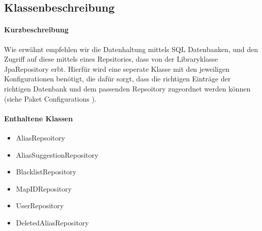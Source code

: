 \subsection*{Klassenbeschreibung}%
\paragraph*{Kurzbeschreibung}
Wie erwähnt empfehlen wir die Datenhaltung mittels SQL Datenbanken, und den Zugriff auf diese mittels eines Repsitories,
dass von der Libraryklasse \dq JpaRepository \dq erbt. Hierfür wird eine seperate Klasse mit den jeweiligen Konfigurationen benötigt,
die dafür sorgt, dass die richtigen Einträge der richtigen Datenbank und dem passenden Repsoitory zugeordnet werden können (siehe Paket \dq Configurations \dq).

\paragraph*{Enthaltene Klassen}
\begin{itemize}
    \item AliasRepsoitory
    \item AliasSuggestionRepository
    \item BlacklistRepository
    \item MapIDRepository
    \item UserRepository
    \item DeletedAliasRepository
\end{itemize}
